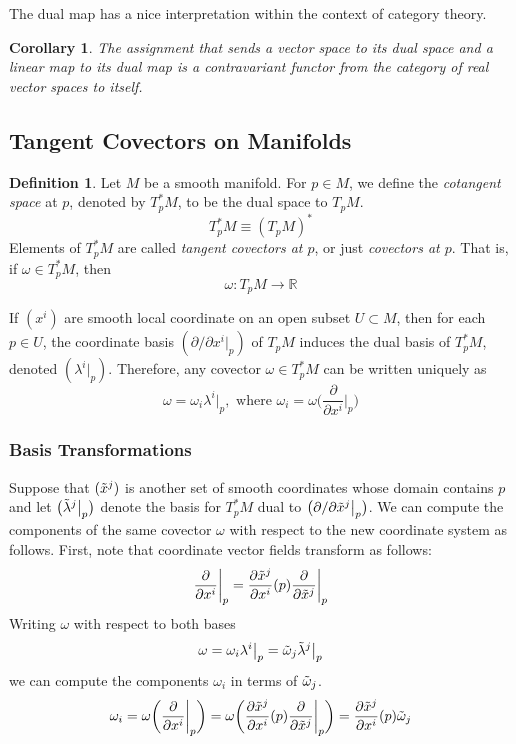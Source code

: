 \documentclass{article}
\newtheorem{corollary}{Corollary}[theorem]
\theoremstyle{remark}
\theoremstyle{definition}
\newtheorem{definition}{Definition}[section]
\begin{document}
  The dual map has a nice interpretation within the context of category theory.

  \begin{corollary}
  The assignment that sends a vector space to its dual space and a linear map to its dual map is a contravariant functor from the category of real vector spaces to itself. 
  \end{corollary}

  \subsection{Tangent Covectors on Manifolds}

    \begin{definition}
    Let $M$ be a smooth manifold. For $p \in M$, we define the \textit{cotangent space} at $p$, denoted by $T_p^* M$, to be the dual space to $T_p M$. 
    \[T_p^* M \equiv (T_p M)^*\]
    Elements of $T_p^* M$ are called \textit{tangent covectors at $p$}, or just \textit{covectors at $p$}. That is, if $\omega \in T_p^* M$, then 
    \[\omega: T_p M \longrightarrow \mathbb{R}\]
    \end{definition}

    If $(x^i)$ are smooth local coordinate on an open subset $U \subset M$, then for each $p \in U$, the coordinate basis $(\partial/\partial x^i |_p )$ of $T_p M$ induces the dual basis of $T_p^* M$, denoted $(\lambda^i |_p)$. Therefore, any covector $\omega \in T_p^* M$ can be written uniquely as 
    \[\omega = \omega_i \lambda^i \big|_p, \text{ where } \omega_i = \omega \bigg( \frac{\partial}{\partial x^i} \bigg|_p \bigg)\]

    \subsubsection{Basis Transformations}

      Suppose that $(\Tilde{x}^j)$ is another set of smooth coordinates whose domain contains $p$ and let $\big( \Tilde{\lambda}^j \big|_p\big)$ denote the basis for $T_p^* M$ dual to $\big(\partial /\partial \Tilde{x}^j \big|_p \big)$. We can compute the components of the same covector $\omega$ with respect to the new coordinate system as follows. First, note that coordinate vector fields transform as follows: 
      \[\frac{\partial}{\partial x^i} \bigg|_p = \frac{\partial \Tilde{x}^j}{\partial x^i} (p) \frac{\partial}{\partial \Tilde{x}^j} \bigg|_p\]
      Writing $\omega$ with respect to both bases 
      \[\omega = \omega_i \lambda^i \big|_p = \Tilde{\omega}_j \Tilde{\lambda}^j \big|_p\]
      we can compute the components $\omega_i$ in terms of $\Tilde{\omega}_j$. 
      \[\omega_i = \omega \bigg( \frac{\partial}{\partial x^i} \bigg|_p \bigg) = \omega \bigg( \frac{\partial \Tilde{x}^j}{\partial x^i} (p) \frac{\partial}{\partial \Tilde{x}^j} \bigg|_p \bigg) = \frac{\partial \Tilde{x}^j}{\partial x^i} (p) \Tilde{\omega}_j\]
\end{document}
